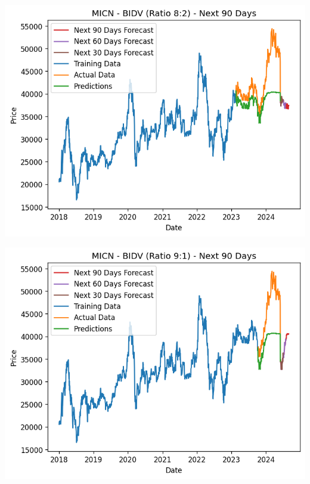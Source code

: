 \documentclass[conference]{IEEEtran}
\begin{document}
\begin{minipage}{0.23\textwidth}
    \centering
    \includegraphics[width=\linewidth]{images/MICN/MICN_BIDV_82.png}
    \label{fig:image1}
\end{minipage}
\hfill
\begin{minipage}{0.23\textwidth}
    \centering
    \includegraphics[width=\linewidth]{images/MICN/MICN_BIDV_91.png}
    \label{fig:image2}
\end{minipage}
\end{document}
